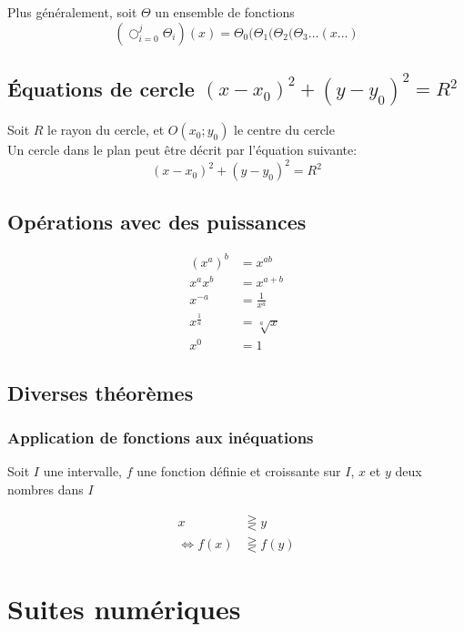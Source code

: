 \documentclass{article}
\begin{document}
Plus généralement, soit $\Theta$ un ensemble de fonctions
\[\left(\bigcirc_{i=0}^{j} \Theta_i\right)(x) = \Theta_0 ( \Theta_1 ( \Theta_2 ( \Theta_3 \dots ( x \dots )\]

\subsection{Équations de cercle $(x - x_0)^2 + (y - y_0)^2 = R^2$}

Soit $R$ le rayon du cercle, et $O(x_0; y_0)$ le centre du cercle\\
Un cercle dans le plan peut être décrit par l'équation suivante:
\[(x - x_0)^2 + (y - y_0)^2 = R^2\]

\subsection{Opérations avec des puissances}

\begin{equation*}
    \begin{split}
        (x^a)^b &= x^{ab} \\
        x^a x^b &= x^{a+b} \\
        x^{-a} &= \frac{1}{x^a} \\
        x^{\frac{1}{a}} &= \sqrt[a]{x} \\
        x^0 &= 1
    \end{split}
\end{equation*}

\subsection{Diverses théorèmes}

\subsubsection{Application de fonctions aux inéquations}

Soit $I$ une intervalle, $f$ une fonction définie et croissante sur $I$, $x$ et $y$ deux nombres dans $I$

\begin{equation*}
    \begin{split}
        x &\gtreqless y \\
\iff    f(x) &\gtreqless f(y)
    \end{split}
\end{equation*}

\newpage\section{Suites numériques}
\end{document}
